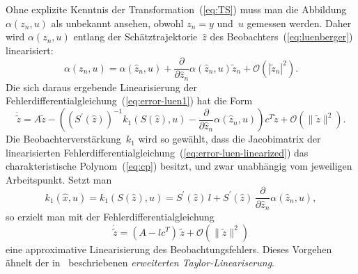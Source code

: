 Ohne explizite Kenntnis der Transformation~(\ref{eq:TS}) muss man
die Abbildung $\alpha(z_{n},u)$ als unbekannt ansehen, obwohl $z_{n}=y$
und~$u$ gemessen werden. Daher wird $\alpha(z_{n},u)$ entlang der
Schätztrajektorie~$\hat{z}$ des Beobachters~(\ref{eq:luenberger})
linearisiert: 
\[
\alpha(z_{n},u)=\alpha(\hat{z}_{n},u)+\frac{\partial}{\partial\hat{z}_{n}}\alpha(\hat{z}_{n},u)\tilde{z}_{n}+\mathcal{O}(|\tilde{z}_{n}|^{2}).
\]
Die sich daraus ergebende Linearisierung der Fehlerdifferentialgleichung~(\ref{eq:error-luen1})
hat die Form 
\begin{equation}
\dot{\tilde{z}}=A\tilde{z}-\left(\left(S^{\prime}(\hat{z})\right)^{-1}k_{1}(S(\hat{z}),u)-\frac{\partial}{\partial\hat{z}_{n}}\alpha(\hat{z}_{n},u)\right)c^{T}\tilde{z}+\mathcal{O}(\|\tilde{z}\|^{2}).\label{eq:error-luen-linearized}
\end{equation}
Die Beobachterverstärkung~$k_{1}$ wird so gewählt, dass die Jacobimatrix
der linearisierten Fehlerdifferentialgleichung~(\ref{eq:error-luen-linearized})
das charakteristische Polynom~(\ref{eq:cp}) besitzt, und zwar unabhängig
vom jeweiligen Arbeitspunkt. Setzt man 
\begin{equation}
k_{1}(\hat{x},u)=k_{1}(S(\hat{z}),u)=S^{\prime}(\hat{z})\,l+S^{\prime}(\hat{z})\,\frac{\partial}{\partial\hat{z}_{n}}\alpha(\hat{z}_{n},u),\label{eq:k1z}
\end{equation}
 so erzielt man mit der Fehlerdifferentialgleichung 
\begin{equation}
\dot{\tilde{z}}=(A-lc^{T})\,\tilde{z}+\mathcal{O}(\|\tilde{z}\|^{2})\label{eq:error-dgl-ordnung-1}
\end{equation}
eine approximative Linearisierung des Beobachtungsfehlers.
Dieses Vorgehen ähnelt der in~\cite{baumann86} beschriebenen \emph{erweiterten
Taylor-Lineariserung}.

